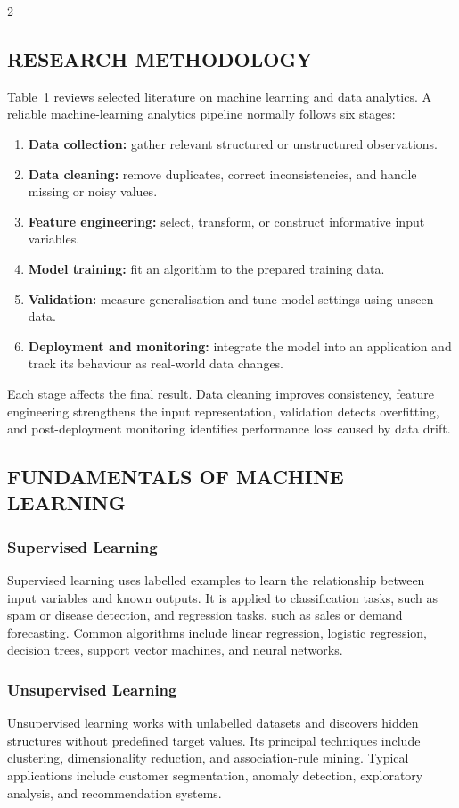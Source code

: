 \begin{multicols}{2}
  \subsection*{\centering\uppercase{Research Methodology}}
  Table~1 reviews selected literature on machine learning and data analytics.
  A reliable machine-learning analytics pipeline normally follows six stages:
  \begin{enumerate}\justifying
    \item \textbf{Data collection:} gather relevant structured or unstructured observations.
    \item \textbf{Data cleaning:} remove duplicates, correct inconsistencies, and handle missing or noisy values.
    \item \textbf{Feature engineering:} select, transform, or construct informative input variables.
    \item \textbf{Model training:} fit an algorithm to the prepared training data.
    \item \textbf{Validation:} measure generalisation and tune model settings using unseen data.
    \item \textbf{Deployment and monitoring:} integrate the model into an application and track its behaviour as real-world data changes.
  \end{enumerate}
  Each stage affects the final result. Data cleaning improves consistency, feature engineering strengthens the input representation, validation detects overfitting, and post-deployment monitoring identifies performance loss caused by data drift.

  \subsection*{\centering\uppercase{Fundamentals of Machine Learning}}
  \subsubsection*{Supervised Learning}
  Supervised learning uses labelled examples to learn the relationship between input variables and known outputs. It is applied to classification tasks, such as spam or disease detection, and regression tasks, such as sales or demand forecasting. Common algorithms include linear regression, logistic regression, decision trees, support vector machines, and neural networks.

  \subsubsection*{Unsupervised Learning}
  Unsupervised learning works with unlabelled datasets and discovers hidden structures without predefined target values. Its principal techniques include clustering, dimensionality reduction, and association-rule mining. Typical applications include customer segmentation, anomaly detection, exploratory analysis, and recommendation systems.


\end{multicols}
